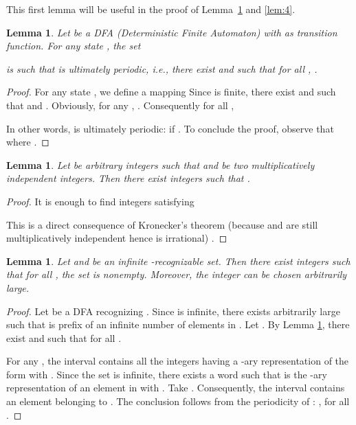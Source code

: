 \documentclass{beatcs}
\newtheorem{lemma}[proposition]{Lemma}
\begin{document}
This first lemma will be useful in the proof of Lemma~\ref{lem:3} and
\ref{lem:4}.
\begin{lemma}\label{lem:1}
  Let  be a DFA (Deterministic
  Finite Automaton) with  as transition
  function. For any state , the set
  
  is
  such that  is ultimately periodic, i.e., there
  exist  and  such that for all ,
  .
\end{lemma}

\begin{proof}
  For any state , we define a mapping 
  Since
   is finite, there exist  and  such that
   and . Obviously, for any
  , . Consequently
  for all ,
  
  In other words,  is ultimately
  periodic:  if . To conclude the
  proof, observe that  where
  .
\end{proof}

\begin{lemma}\label{lem:2}
    Let  be arbitrary integers
    such that  and  be two multiplicatively independent
    integers.  Then there exist integers  such that
    .
\end{lemma}

\begin{proof}
  It is enough to find integers  satisfying
  
  This is a direct consequence of
  Kronecker's theorem (because  and  are still
  multiplicatively independent hence  is
  irrational) \cite{HW}.
\end{proof}

\begin{lemma}\label{lem:3}
    Let  and  be an infinite
    -recognizable set. Then there exist integers  such
    that for all , the set
     is nonempty. Moreover, the
    integer  can be chosen arbitrarily large.
\end{lemma}

\begin{proof}
    Let  be a DFA recognizing
    . Since  is infinite, there exists  arbitrarily
    large such that  is prefix of an infinite number of
    elements in . Let . By Lemma
    \ref{lem:1}, there exist  and  such that
     for all .
  
  For any , the interval  contains all the
  integers having a -ary representation of the form 
  with . Since the set  is
  infinite, there exists a word  such that  is the
  -ary representation of an element in  with .
  Take .  Consequently, the interval  contains
  an element belonging to . The conclusion follows from the
  periodicity of :
  , for all .
\end{proof}
\end{document}
